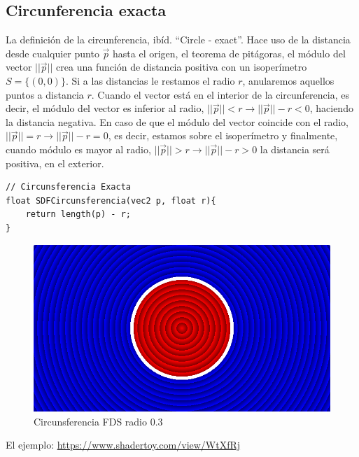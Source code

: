 \subsection{Circunferencia exacta}
La definición de la circunferencia, ibíd. \enquote{Circle - exact}. Hace uso de la distancia desde cualquier punto \(\Vec{p}\) hasta el origen, el teorema de pitágoras, el módulo del vector \(\vert\vert\Vec{p}\vert\vert\)  crea una función de distancia positiva con un isoperímetro \(S=\{(0,0)\}\). Si a las distancias le restamos el radio \(r\), anularemos aquellos puntos a distancia \(r\). Cuando el vector está en el interior de la circunferencia, es decir, el módulo del vector es inferior al radio, \(\vert\vert\Vec{p}\vert\vert < r \longrightarrow \vert\vert\Vec{p}\vert\vert - r < 0\), haciendo la distancia negativa. En caso de que el módulo del vector coincide con el radio, \(\vert\vert\Vec{p}\vert\vert = r \longrightarrow \vert\vert\Vec{p}\vert\vert - r = 0\), es decir, estamos sobre el isoperímetro y finalmente, cuando módulo es mayor al radio, \(\vert\vert\Vec{p}\vert\vert > r \longrightarrow \vert\vert\Vec{p}\vert\vert - r > 0\) la distancia será positiva, en el exterior.
\begin{lstlisting}
// Circunsferencia Exacta
float SDFCircunsferencia(vec2 p, float r){
    return length(p) - r;
}
\end{lstlisting}
\begin{figure}[H]
  \centering
  \captionsetup{justification=centering}%
  \includegraphics[width=1.0\textwidth]{secciones/imagenes/sdf/2d/sdf_circunsferencia.png}
  \caption{Circunsferencia FDS radio \(0.3\)}
  \label{fig:circ}
\end{figure}

El ejemplo: \url{https://www.shadertoy.com/view/WtXfRj}

